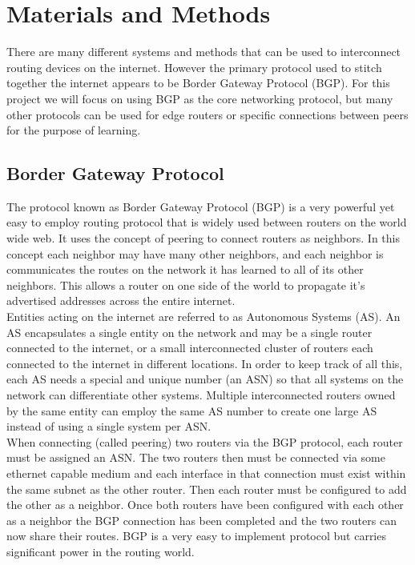 \documentclass[12pt]{article}
\begin{document}
\section{Materials and Methods}

There are many different systems and methods that can be used to interconnect routing devices on the internet. 
However the primary protocol used to stitch together the internet appears to be Border Gateway Protocol (BGP).
For this project we will focus on using BGP as the core networking protocol, but many other protocols can be 
used for edge routers or specific connections between peers for the purpose of learning.


\subsection{Border Gateway Protocol}

The protocol known as Border Gateway Protocol (BGP) is a very powerful yet easy to employ routing protocol that
is widely used between routers on the world wide web. It uses the concept of peering to connect routers as neighbors.
In this concept each neighbor may have many other neighbors, and each neighbor is communicates the routes on the network
it has learned to all of its other neighbors. This allows a router on one side of the world to propagate it's advertised
addresses across the entire internet.
\\

Entities acting on the internet are referred to as Autonomous Systems (AS). An AS encapsulates a single entity on the network
and may be a single router connected to the internet, or a small interconnected cluster of routers each connected to the internet
in different locations. In order to keep track of all this, each AS needs a special and unique number (an ASN) so that all systems on the network
can differentiate other systems. Multiple interconnected routers owned by the same entity can employ the same AS number to create one
large AS instead of using a single system per ASN.
\\

When connecting (called peering) two routers via the BGP protocol, each router must be assigned an ASN. The two routers then must be connected via 
some ethernet capable medium and each interface in that connection must exist within the same subnet as the other router. Then each router must
be configured to add the other as a neighbor. Once both routers have been configured with each other as a neighbor the BGP connection has been
completed and the two routers can now share their routes. BGP is a very easy to implement protocol but carries significant power in the routing
world.
\\
\end{document}
